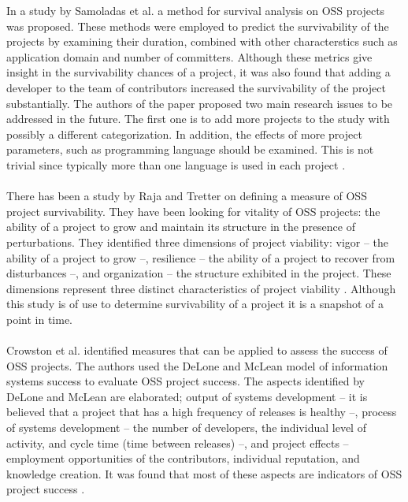 In a study by Samoladas et al. a method for survival analysis on OSS projects
was proposed. These methods were employed to predict the
survivability of the projects by examining their duration, combined with other
characterstics such as application domain and number of committers. Although
these metrics give insight in the survivability chances of a project, it was
also found that adding a developer to the team of contributors increased the
survivability of the project substantially. The authors of the paper proposed
two main research issues to be addressed in the future. The first one is to add
more projects to the study with possibly a different categorization. In
addition, the effects of more project parameters, such as programming language
should be examined. This is not trivial since typically more than one language
is used in each project \cite{samoladas2010}.

\paragraph{}
There has been a study by Raja and Tretter on defining a measure of OSS project
survivability. They have been looking for vitality of OSS projects: the ability
of a project to grow and maintain its structure in the presence of
perturbations. They identified three dimensions of project viability: vigor --
the ability of a project to grow --, resilience -- the ability of a project to
recover from disturbances --, and organization -- the structure exhibited in the
project. These dimensions represent three distinct characteristics of project
viability \cite{raja2012}. Although this study is of use to determine
survivability of a project it is a snapshot of a point in time.

\paragraph{}
Crowston et al. identified measures that can be applied to assess the success of
OSS projects. The authors used the DeLone and McLean model of information
systems success to evaluate OSS project success. The aspects identified by
DeLone and McLean are elaborated; output of systems development -- it is
believed that a project that has a high frequency of releases is healthy --,
process of systems development -- the number of developers, the individual
level of activity, and cycle time (time between releases) --, and
project effects -- employment opportunities of the contributors, individual
reputation, and knowledge creation. It was found that most of these aspects are
indicators of OSS project success \cite{crowston2003}.

